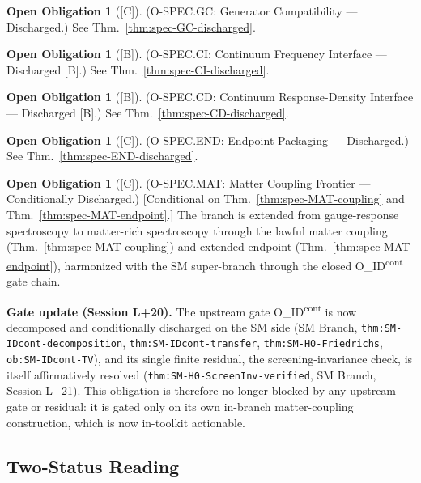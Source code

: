 \documentclass[12pt,oneside]{amsbook}
\theoremstyle{plain}
\theoremstyle{definition}
\newtheorem{obligation}[theorem]{Open Obligation}
\theoremstyle{remark}
\newcommand{\status}[1]{\textup{[#1]}}
\begin{document}
\begin{obligation}[\status{C}]\label{ob:spec-GC}
\textup{(O-SPEC.GC: Generator Compatibility --- Discharged.)}
See Thm.~\ref{thm:spec-GC-discharged}.
\end{obligation}

\begin{obligation}[\status{B}]\label{ob:spec-CI}
\textup{(O-SPEC.CI: Continuum Frequency Interface --- Discharged [B].)}
See Thm.~\ref{thm:spec-CI-discharged}.
\end{obligation}

\begin{obligation}[\status{B}]\label{ob:spec-CD}
\textup{(O-SPEC.CD: Continuum Response-Density Interface --- Discharged [B].)}
See Thm.~\ref{thm:spec-CD-discharged}.
\end{obligation}

\begin{obligation}[\status{C}]\label{ob:spec-END}
\textup{(O-SPEC.END: Endpoint Packaging --- Discharged.)}
See Thm.~\ref{thm:spec-END-discharged}.
\end{obligation}

\begin{obligation}[\status{C}]\label{ob:spec-MAT}
\textup{(O-SPEC.MAT: Matter Coupling Frontier --- Conditionally
Discharged.)}
\textup{[Conditional on Thm.~\ref{thm:spec-MAT-coupling} and
Thm.~\ref{thm:spec-MAT-endpoint}.]}
The branch is extended from gauge-response spectroscopy to
matter-rich spectroscopy through the lawful matter coupling
(Thm.~\ref{thm:spec-MAT-coupling}) and extended endpoint
(Thm.~\ref{thm:spec-MAT-endpoint}), harmonized with the SM
super-branch through the closed O\_ID\textsuperscript{cont} gate
chain.

\textbf{Gate update (Session L+20).}  The upstream gate
O\_ID\textsuperscript{cont} is now decomposed and conditionally
discharged on the SM side (SM Branch,
\texttt{thm:SM-IDcont-decomposition},
\texttt{thm:SM-IDcont-transfer}, \texttt{thm:SM-H0-Friedrichs},
\texttt{ob:SM-IDcont-TV}), and its single finite residual, the
screening-invariance check, is itself affirmatively resolved
(\texttt{thm:SM-H0-ScreenInv-verified}, SM Branch, Session L+21).
This obligation is therefore no longer blocked by any upstream
gate or residual: it is gated only on its own in-branch
matter-coupling construction, which is now in-toolkit actionable.
\end{obligation}

\subsection{Two-Status Reading}\label{sec:spec-two-status}
\end{document}
